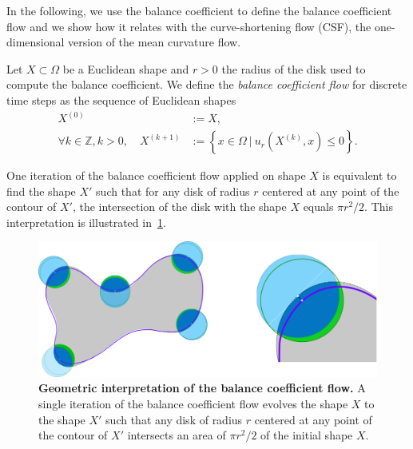 \documentclass[review]{siamart220329}
\newcommand{\Z}{\mathbb{Z}}
\begin{document}
In the following, we use the balance coefficient to define the balance
coefficient flow and we show how it relates with the curve-shortening
flow (CSF), the one-dimensional version of the mean curvature flow.

\begin{definition}
  Let $X \subset \Omega$ be a Euclidean shape and $r>0$ the radius of the disk used to compute the balance coefficient. We define the \emph{balance coefficient flow} for discrete time steps as the sequence of Euclidean shapes
%
%
\begin{align}
  X^{(0)} & := X, \nonumber \\
  \forall k \in \Z, k > 0, \quad X^{(k+1)} & := \left\{ x \in \Omega \: | \: u_r(X^{(k)}, x) \leq 0 \right\}. \label{eq-balance-coefficient-flow}
\end{align}
%
%
\end{definition}
%
%
 One iteration of the balance coefficient flow applied on shape $X$ is equivalent to find the shape $X'$ such that for any disk of radius $r$ centered at any point of the contour of $X'$, the intersection of the disk with the shape $X$ equals $\pi r^2/2$. This interpretation is illustrated in~\cref{fig:geometric-interpretation}.
%
% 
\begin{figure}
\center
\includegraphics[scale=0.25]{figures/zero-level-set/geometric-interpretation.png}
\caption{\textbf{Geometric interpretation of the balance coefficient flow.} A single iteration of the balance coefficient flow evolves the shape $X$ to the shape $X'$ such that any disk of radius $r$ centered at any point of the contour of $X'$ intersects  an area of $\pi r^2/2$ of the initial shape $X$.}
\label{fig:geometric-interpretation}
\end{figure}
% 
%
\end{document}
